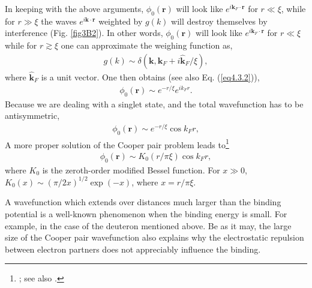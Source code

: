 In keeping with the above arguments, $\phi_0(\mathbf r)$ will look like $e^{i\mathbf k_F\cdot \mathbf r}$ for $r\ll\xi$, while for $r\gg \xi$ the waves $e^{i\mathbf k\cdot \mathbf r}$
weighted by $g(k)$ will destroy themselves by interference   (Fig. \ref{fig3B2}). In other words, $\phi_0(\mathbf r)$ will look like $e^{i\mathbf k_F\cdot \mathbf r}$ for $r\ll\xi$ while for $r\gtrsim\xi$ one can approximate the weighing function as,
\begin{align}\label{eq3B7}
g(k)\sim\delta(\mathbf k,\mathbf k_F+i\mathbf{\hat k}_F/\xi),
\end{align}
where $\mathbf{\hat k}_F$ is a unit vector. One then obtains (see also Eq. (\ref{eq4.3.2})),
\begin{align}\label{eq3B8}
\phi_0(\mathbf r)\sim e^{-r/\xi}e^{ik_Fr}.
\end{align}
Because we are dealing with a singlet state, and the total wavefunction has to be antisymmetric,
\begin{align}\label{eq3B9}
\phi_0(\mathbf r)\sim e^{-r/\xi}\cos k_Fr,
\end{align}
 A more proper solution of the Cooper pair problem leads to\footnote{\cite{Kadin:07}; see also \cite{VanWitsen:14}.}
\begin{align}\label{eq3B10}
\phi_0(\mathbf r)\sim K_0(r/\pi\xi)\cos k_Fr,
\end{align}
where $K_0$ is the zeroth-order modified Bessel function. For $x\gg 0$, $K_0(x)\sim (\pi/2x)^{1/2}\exp(-x)$, where $x=r/\pi\xi$.

A wavefunction which extends over distances much larger than the binding potential is a well-known phenomenon when the binding energy is small. For example,  in the case of the deuteron mentioned above.  Be as it may, the large size of the Cooper pair wavefunction also explains why the electrostatic repulsion between electron partners does not appreciably influence the binding. 

